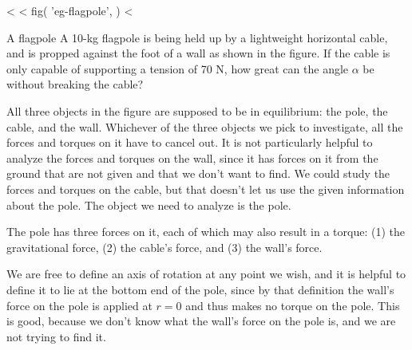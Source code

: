 <%
<%
  fig(
    'eg-flagpole',
  )
<%
\begin{eg}{A flagpole}\label{eg:flagpole}
\egquestion A 10-kg flagpole is being held up by a lightweight
horizontal cable, and is propped against the foot of a wall
as shown in the figure. If the cable is only capable of
supporting a tension of 70 N, how great can the angle
$\alpha $ be without breaking the cable?

\eganswer All three objects in the figure are supposed to be
in equilibrium: the pole, the cable, and the wall. Whichever
of the three objects we pick to investigate, all the forces
and torques on it have to cancel out. It is not particularly
helpful to analyze the forces and torques on the wall, since
it has forces on it from the ground that are not given and
that we don't want to find. We could study the forces and
torques on the cable, but that doesn't let us use the given
information about the pole. The object we need to analyze is the pole.

The pole has three forces on it, each of which may also
result in a torque: (1) the gravitational force, (2) the
cable's force, and (3) the wall's force.

We are free to define an axis of rotation at any point we
wish, and it is helpful to define it to lie at the bottom
end of the pole, since by that definition the wall's force
on the pole is applied at $r=0$ and thus makes no torque on
the pole. This is good, because we don't know what the
wall's force on the pole is, and we are not trying to find it.


\end{eg}
